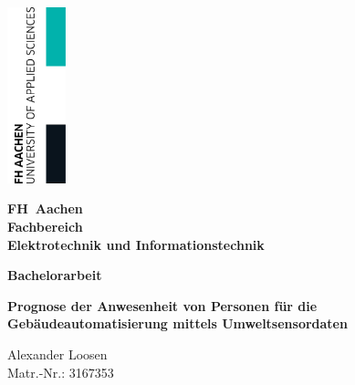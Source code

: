 \begin{titlepage}
	\thispagestyle{empty}

	\begin{flushright}
		\includegraphics[width=1.7cm]{./pic/FHAC.jpg}
	\end{flushright}

	\vspace{-2.5cm}

	\centering \sffamily \bfseries \Large FH~Aachen \\
	\vspace{0.5cm}
	\normalsize Fachbereich\\
	Elektrotechnik und Informationstechnik

	\vspace{1cm}

	\centering \bfseries Bachelorarbeit

	\vspace{0.8cm}

	\centering \begin{minipage}[t]{17cm}
		\centering \bfseries \large Prognose der Anwesenheit von Personen für die Gebäudeautomatisierung 
		mittels Umweltsensordaten
		\medskip
	\end{minipage}

	\vspace{1.5cm}

	\begin{minipage}[t]{9cm}
		\centering Alexander Loosen \\ Matr.-Nr.: 3167353
	\end{minipage}

	\vspace{2.1cm}


\end{titlepage}
